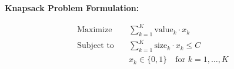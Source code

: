 \documentclass{article}
\begin{document}
\textbf{Knapsack Problem Formulation:}

\begin{align*}
    \text{Maximize} \quad & \sum_{k=1}^{K} \text{value}_k \cdot x_k \\
    \text{Subject to} \quad & \sum_{k=1}^{K} \text{size}_k \cdot x_k \leq C \\
    & x_k \in \{0, 1\} \quad \text{for } k = 1, \ldots, K
\end{align*}
\end{document}

